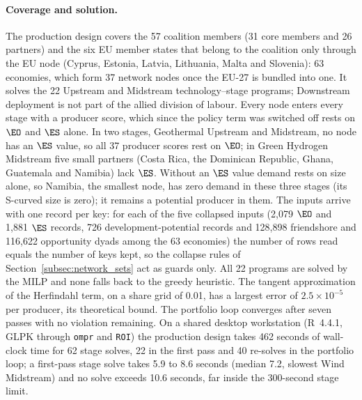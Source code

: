 \paragraph{Coverage and solution.} The production design covers the 57 coalition members (31 core
members and 26 partners) and the six EU member states that belong to the coalition only through
the EU node (Cyprus, Estonia, Latvia, Lithuania, Malta and Slovenia): 63 economies, which form
37 network nodes once the EU-27 is bundled into one. It solves the 22 Upstream and Midstream
technology--stage programs; Downstream deployment is not part of the allied division of labour.
Every node enters every stage with a producer score, which since the policy term was switched off
rests on $\EO$ and $\ES$ alone. In two stages, Geothermal Upstream and Midstream, no node has an
$\ES$ value, so all 37 producer scores rest on $\EO$; in Green Hydrogen Midstream five small
partners (Costa Rica, the Dominican Republic, Ghana, Guatemala and Namibia) lack $\ES$. Without
an $\ES$ value demand rests on size alone, so Namibia, the smallest node, has zero demand in these
three stages (its S-curved size is zero); it remains a potential producer in them. The inputs arrive with one record per key: for each of the five
collapsed inputs (2{,}079 $\EO$ and 1{,}881 $\ES$ records, 726 development-potential records and
128{,}898 friendshore and 116{,}622 opportunity dyads among the 63 economies) the number of rows
read equals the number of keys kept, so the collapse rules of Section~\ref{subsec:network_sets}
act as guards only. All 22 programs are solved by the MILP and none falls back to the greedy
heuristic. The tangent approximation of the Herfindahl term, on a share grid of 0.01, has a
largest error of $2.5\times10^{-5}$ per producer, its theoretical bound. The portfolio loop
converges after seven passes with no violation remaining. On a shared desktop workstation
(R~4.4.1, GLPK through \texttt{ompr} and \texttt{ROI}) the production design takes 462 seconds
of wall-clock time for 62 stage solves, 22 in the first pass and 40 re-solves in the portfolio
loop; a first-pass stage solve takes 5.9 to 8.6 seconds (median 7.2, slowest Wind Midstream) and
no solve exceeds 10.6 seconds, far inside the 300-second stage limit.

